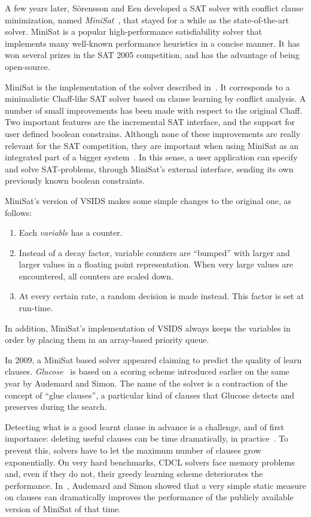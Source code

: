 A few years later, S\"orensson and Een developed a SAT solver with conflict
clause minimization, named \emph{MiniSat}~\cite{minisat}, that stayed for a
while as the state-of-the-art solver. MiniSat is a popular high-performance
satisfiability solver that implements many well-known performance heuristics in
a concise manner. It has won several prizes in the SAT 2005 competition, and has
the advantage of being open-source. 

MiniSat is the implementation of the solver described
in~\cite{een2003extensible}. It corresponds to a minimalistic Chaff-like SAT
solver based on clause learning by conflict analysis. A number of small
improvements has been made with respect to the original Chaff. Two important
features are the incremental SAT interface, and the support for user defined
boolean constrains. Although none of these improvements are really relevant for
the SAT competition, they are important when using MiniSat as an integrated part
of a bigger system~\cite{minisat}. In this sense, a user application can specify
and solve SAT-problems, through MiniSat's external interface, sending its own
previously known boolean constraints.

MiniSat's version of VSIDS makes some simple changes to the original one, as
follows:

\begin{enumerate}
    \item Each \emph{variable} has a counter.
    \item Instead of a decay factor, variable counters are ``bumped'' with
        larger and larger values in a floating point representation. When very
        large values are encountered, all counters are scaled down.
    \item At every certain rate, a random decision is made instead.
        This factor is set at run-time.
\end{enumerate}
In addition, MiniSat's implementation of VSIDS always keeps the variables in
order by placing them in an array-based priority queue.

In 2009, a MiniSat based solver appeared claiming to predict the quality of
learn clauses. \emph{Glucose}~\cite{glucose} is based on a scoring scheme
introduced earlier on the same year by Audemard and Simon. The name of the
solver is a contraction of the concept of ``glue clauses'', a particular kind of
clauses that Glucose detects and preserves during the search.

Detecting what is a good learnt clause in advance is a challenge, and of first
importance: deleting useful clauses can be time dramatically, in
practice~\cite{glucose}. To prevent this, solvers have to let the maximum
number of clauses grow exponentially. On very hard benchmarks, CDCL solvers face
memory problems and, even if they do not, their greedy learning scheme
deteriorates the performance.  In~\cite{audemard2009predicting}, Audemard and
Simon showed that a very simple static measure on clauses can dramatically
improves the performance of the publicly available version of MiniSat of that
time.

